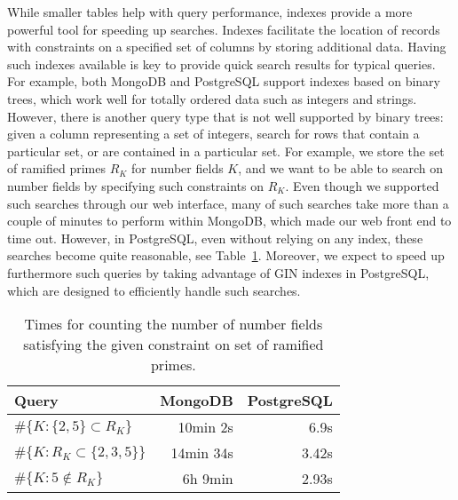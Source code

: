 \documentclass{article}
\begin{document}
While smaller tables help with query performance, indexes provide a more powerful tool for speeding up searches.
Indexes facilitate the location of records with constraints on a specified set of columns by storing additional data.
Having such indexes available is key to provide quick search results for typical queries.
For example, both MongoDB and PostgreSQL support indexes based on binary trees, which work well for totally ordered data such as integers and strings.
However, there is another query type that is not well supported by binary trees: given a column representing a set of integers, search for rows that contain a particular set, or are contained in a particular set.
For example, we store the set of ramified primes $R_K$ for number fields $K$, and we want to be able to search on number fields by specifying such constraints on $R_K$.
Even though we supported such searches through our web interface, many of such searches take more than a couple of minutes to perform within MongoDB, which made our web front end to time out.
However, in  PostgreSQL, even without relying on any index, these searches become quite reasonable, see Table~\ref{table:ramps}.
Moreover, we expect to speed up furthermore such queries by taking advantage of GIN indexes in PostgreSQL, which are designed to efficiently handle such searches.
\begin{table}[h!]
  \begin{center}
  \begin{tabular}{l|r|r}
Query & MongoDB & PostgreSQL\\
\hline
$\#\{K : \{2, 5\} \subset R_K\}$ & 10min 2s & 6.9s\\
$\#\{K: R_K \subset \{2, 3, 5\} \}$ & 14min 34s & 3.42s\\
$\#\{K : 5 \notin R_K \}$ & 6h 9min & 2.93s
\end{tabular}
\caption{Times for counting the number of number fields satisfying the given constraint on set of ramified primes.}
\label{table:ramps}
\end{center}
\end{table}

\end{document}
